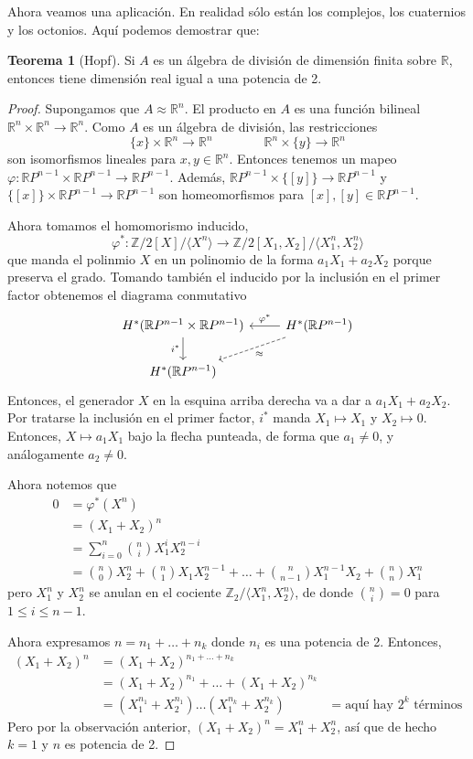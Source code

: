 \documentclass[spanish]{book}
\theoremstyle{definition}
\newtheorem*{teo}{Teorema}
\newcommand{\R}{\mathbb{R}}
\newcommand{\Z}{\mathbb{Z}}
\begin{document}
Ahora veamos una aplicación. En realidad sólo están los complejos, los cuaternios y los octonios. Aquí podemos demostrar que:
\begin{teo}[Hopf]
	Si $A$ es un álgebra de división de dimensión finita sobre $\R$, entonces tiene dimensión real igual a una potencia de 2.
\end{teo}
\begin{proof}
	Supongamos que $A\approx\R^n$. El producto en $A$ es una función bilineal $\R^n\times\R^n\to\R^n$. Como $A$ es un álgebra de división, las restricciones
	\[\{x\}\times\R^n\to\R^n\qquad\qquad\R^n\times\{y\}\to\R^n\]
	son isomorfismos lineales para $x,y\in\R^n$. Entonces tenemos un mapeo $\varphi:\R P^{n-1}\times\R P^{n-1}\to\R P^{n-1}$. Además, $\R P^{n-1}\times\{[y]\}\to\R P^{n-1}$ y $\{[x]\}\times\R P^{n-1}\to\R P^{n-1}$ son homeomorfismos para $[x],[y]\in\R P^{n-1}$.
	
	Ahora tomamos el homomorismo inducido,
	\[\varphi^*:\Z/2[X]\Big/\langle X^n\rangle\to\Z/2[X_1,X_2]\Big/\langle X_1^n,X_2^n\rangle\]
	que manda el polinmio $X$ en un polinomio de la forma $a_1X_1+a_2X_2$ porque preserva el grado. Tomando también el inducido por la inclusión en el primer factor obtenemos el diagrama conmutativo
	\[\begin{tikzcd}
		H^*(\R P^{n-1}\times \R P^{n-1})\arrow[d,"i^*",swap]&H^*(\R P^{n-1})\arrow[l,swap,"\varphi^*"]\arrow[ld,"\approx",dashed]\\
		H^*(\R P^{n-1})
	\end{tikzcd}\]
	Entonces, el generador $X$ en la esquina arriba derecha va a dar a $a_1X_1+a_2X_2$. Por tratarse la inclusión en el primer factor, $i^*$ manda $X_1\mapsto X_1$ y $X_2\mapsto0$. Entonces, $X\mapsto a_1X_1$ bajo la flecha punteada, de forma que $a_1\neq0$, y análogamente $a_2\neq0$.
	
	Ahora notemos que
	\begin{align*}
		0&=\varphi^*(X^n)\\
		&=(X_1+X_2)^n\\
		&=\sum_{i=0}^n\binom{n}{i}X_1^iX_2^{n-i}\\
		&=\binom{n}{0}X_2^n+\binom{n}{1}X_1X_2^{n-1}+\ldots+\binom{n}{n-1}X_1^{n-1}X_2+\binom{n}{n}X_1^n
	\end{align*}
	pero $X^n_1$ y $X^n_2$ se anulan en el cociente $\Z_2/\langle X_1^n,X_2^n\rangle$, de donde $\binom{n}{i}=0$ para $1\leq i\leq n-1$.
	
	Ahora expresamos $n=n_1+\ldots+n_k$ donde $n_i$ es una potencia de 2. Entonces,
	\begin{align*}
		(X_1+X_2)^n&=(X_1+X_2)^{n_1+\ldots+n_k}\\
		&=(X_1+X_2)^{n_1}+\ldots+(X_1+X_2)^{n_k}\\
		&=(X_1^{n_1}+X_2^{n_1})\ldots(X_1^{n_k}+X_2^{n_k})
		&=\text{aquí hay }2^k\text{ términos}
	\end{align*}
	Pero por la observación anterior, $(X_1+X_2)^n=X_1^n+X_2^n$, así que de hecho $k=1$ y $n$ es potencia de 2.
\end{proof}
\end{document}

